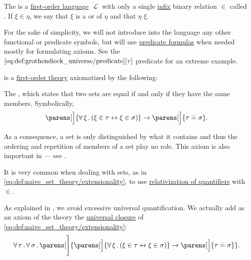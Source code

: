 \begin{definition}\label{def:naive_set_theory}
  The  is a \hyperref[def:first_order_syntax]{first-order language} \( \mscrL \) with only a single \hyperref[rem:first_order_formula_conventions/infix]{infix} binary relation \( \in \) called . If \( \xi \in \eta \), we say that \( \xi \) is a  or  of \( \eta \) and that \( \eta \)  \( \xi \).

  For the sake of simplicity, we will not introduce into the language any other functional or predicate symbols, but will use \hyperref[rem:predicate_formula]{predicate formulas} when needed mostly for formulating axioms. See the \( \ref{eq:def:grothendieck_universe/predicate}[\tau] \) predicate for an extreme example.

   is a \hyperref[def:first_order_theory]{first-order theory} axiomatized by the following:
  \begin{thmenum}
     The , which states that two sets are equal if and only if they have the same members. Symbolically,
    \begin{equation}\label{eq:def:naive_set_theory/extensionality}
      \parens[\Big]{ \qforall \xi (\xi \in \tau \leftrightarrow \xi \in \sigma) } \rightarrow \parens[\Big]{ \tau \doteq \sigma }.
    \end{equation}

    As a consequence, a set is only distinguished by what it contains and thus the ordering and repetition of members of a set play no role. This axiom is also important in  --- see .

    It is very common when dealing with sets, as in \eqref{eq:def:naive_set_theory/extensionality}, to use \hyperref[rem:first_order_formula_conventions/relativization]{relativization of quantifiers} with \( \in \).

    As explained in , we avoid excessive universal quantification. We actually add as an axiom of the theory the \hyperref[thm:implicit_universal_quantification]{universal closure} of \eqref{eq:def:naive_set_theory/extensionality}:
    \begin{equation}\label{eq:def:naive_set_theory/extensionality_quantified}
      \qforall \tau \qforall \sigma \parens[\Bigg]{ \parens[\Big]{ \qforall \xi (\xi \in \tau \leftrightarrow \xi \in \sigma) } \rightarrow \parens[\Big]{ \tau \doteq \sigma } }.
    \end{equation}


\end{thmenum}
\end{definition}
